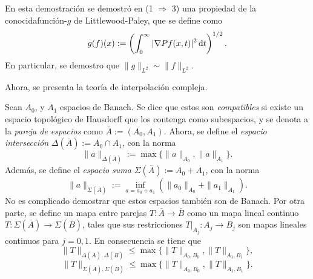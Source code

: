\begin{remark}
	En esta demostración se demostró en (1 $\Rightarrow$ 3) una propiedad de la conocidafunción-$g$ de Littlewood-Paley, que se define como 
	\begin{equation*}
		g(f)(x) := \left(\int_0^\infty |\nabla Pf(x, t)|^2 \mathop{}\!\mathrm{d} t\right)^{1/2}.
	\end{equation*}
	En particular, se demostro que $\|g\|_{L^2} \sim \|f\|_{L^2}$.
\end{remark}
Ahora, se presenta la teoría de interpolación compleja.
\begin{definition}
	Sean $A_0$, y $A_1$ espacios de Banach. Se dice que estos son \textit{compatibles} si existe un espacio topológico de Hausdorff que los contenga como subespacios, y se denota a la \textit{pareja de espacios} como $\overline{A}:=(A_0, A_1)$. Ahora, se define el \textit{espacio intersección} $\Delta(\overline{A}):=A_0\cap A_1$, con la norma 
	\begin{equation*}
		\|a\|_{\Delta(\overline{A})} := \max \{\|a\|_{A_0}, \|a\|_{A_1}\}.
	\end{equation*} 
	Además, se define el \textit{espacio suma} $\Sigma(\overline{A}):=A_0+A_1$, con la norma
	\begin{equation*}
		\|a\|_{\Sigma(\overline{A})} := \inf_{a=a_0+a_1} (\|a_0\|_{A_0}+\|a_1\|_{A_1}).
	\end{equation*}
	No es complicado demostrar que estos espacios también son de Banach. Por otra parte, se define un mapa entre parejas $T:\overline{A}\to\overline{B}$ como un mapa lineal continuo $T:\Sigma(\overline{A})\to\Sigma(\overline{B})$, tales que sus restricciones  $T|_{A_j}:A_j\to B_j$ son mapas lineales continuos para $j=0,1$. En consecuencia se tiene que 
	\begin{equation*}
		\|T\|_{\Delta(\overline{A}), \Delta(\overline{B})} \leq \max\{\|T\|_{A_0, B_0}, \|T\|_{A_1, B_1}\},
	\end{equation*}
	\begin{equation*}
		\|T\|_{\Sigma(\overline{A}), \Sigma(\overline{B})} \leq \max\{\|T\|_{A_0, B_0}, \|T\|_{A_1, B_1}\}.
	\end{equation*}
\end{definition}
